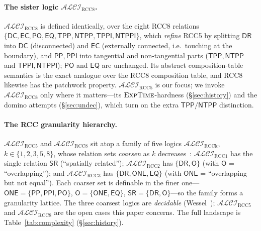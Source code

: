\documentclass[11pt]{article}
\newcommand{\ALCIRCC}[1]{\mathcal{ALCI}_{\mathrm{RCC#1}}}
\newcommand{\DR}{\mathsf{DR}}
\newcommand{\PO}{\mathsf{PO}}
\newcommand{\PP}{\mathsf{PP}}
\newcommand{\PPI}{\mathsf{PPI}}
\newcommand{\EQ}{\mathsf{EQ}}
\newcommand{\EXPTIME}{\textsc{ExpTime}}
\newcommand{\TPP}{\ensuremath{\mathsf{TPP}}}
\newcommand{\NTPP}{\ensuremath{\mathsf{NTPP}}}
\newcommand{\TPPI}{\ensuremath{\mathsf{TPPI}}}
\newcommand{\NTPPI}{\ensuremath{\mathsf{NTPPI}}}
\newcommand{\DC}{\ensuremath{\mathsf{DC}}}
\newcommand{\EC}{\ensuremath{\mathsf{EC}}}
\theoremstyle{plain}
\theoremstyle{definition}
\begin{document}
\paragraph{The sister logic $\ALCIRCC{8}$.} $\ALCIRCC{8}$ is defined
identically, over the eight RCC8 relations
$\{\DC,\EC,\PO,\EQ,\TPP,\NTPP,\TPPI,\NTPPI\}$, which \emph{refine} RCC5 by
splitting $\DR$ into $\DC$ (disconnected) and $\EC$ (externally connected,
i.e.\ touching at the boundary), and $\PP,\PPI$ into tangential and
non-tangential parts ($\TPP,\NTPP$ and $\TPPI,\NTPPI$); $\PO$ and $\EQ$
are unchanged. Its abstract composition-table semantics is the exact
analogue over the RCC8 composition table, and RCC8 likewise has the
patchwork property. $\ALCIRCC{5}$ is our focus; we invoke $\ALCIRCC{8}$
only where it matters---its $\EXPTIME$-hardness (\S\ref{sec:history}) and
the domino attempts (\S\ref{sec:undec}), which turn on the extra
$\TPP/\NTPP$ distinction.

\paragraph{The RCC granularity hierarchy.} $\ALCIRCC5$ and $\ALCIRCC8$ sit
atop a family of five logics $\ALCIRCC{k}$, $k\in\{1,2,3,5,8\}$, whose
relation sets \emph{coarsen} as $k$ decreases~\cite{Wessel2003}:
$\ALCIRCC1$ has the single relation $\mathsf{SR}$ (``spatially related'');
$\ALCIRCC2$ has $\{\DR,\mathsf{O}\}$ (with $\mathsf{O}$ = ``overlapping'');
and $\ALCIRCC3$ has $\{\DR,\mathsf{ONE},\EQ\}$ (with $\mathsf{ONE}$ =
``overlapping but not equal''). Each coarser set is definable in the finer
one---$\mathsf{ONE}=\{\PP,\PPI,\PO\}$, $\mathsf{O}=\{\mathsf{ONE},\EQ\}$,
$\mathsf{SR}=\{\DR,\mathsf{O}\}$---so the family forms a granularity
lattice. The three coarsest logics are \emph{decidable}
(Wessel~\cite{Wessel2003}); $\ALCIRCC5$ and $\ALCIRCC8$ are the open cases
this paper concerns. The full landscape is Table~\ref{tab:complexity}
(\S\ref{sec:history}).
\end{document}

